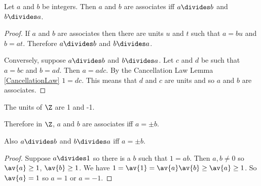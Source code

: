 \documentclass[oneside,12pt]{amsart}
\begin{document}
\begin{lemma}
Let $a$ and $b$ be integers. Then $a$ and $b$ are associates iff $a\divides b$
and $b\divides a$.
\end{lemma}
\begin{proof}
If $a$ and $b$ are associates then there are units $u$ and $t$ such that
$a=bu$ and $b=at$. Therefore $a\divides b$ and $b\divides a$.

Conversely, suppose $a\divides b$ and $b\divides a$. Let $c$ and $d$ be such
that $a=bc$ and $b=ad$. Then $a=adc$. By the Cancellation Law Lemma
\ref{CancellationLaw} $1=dc$. This means that $d$ and $c$ are units and so
$a$ and $b$ are associates.
\end{proof}

\begin{lemma}
The units of $\Z$ are 1 and -1.

Therefore in $\Z$, $a$ and $b$ are associates iff $a=\pm b$.

Also $a\divides b$ and $b\divides a$ iff $a=\pm b$.
\end{lemma}
\begin{proof}
Suppose $a\divides 1$ so there is a $b$ such that $1=ab$.
Then $a,b\not=0$ so $\av{a}\geq 1$, $\av{b}\geq 1$.
We have $1=\av{1} = \av{a}\av{b} \geq \av{a} \geq 1$. So $\av{a} = 1$
so $a=1$ or $a=-1$.
\end{proof}
\end{document}
